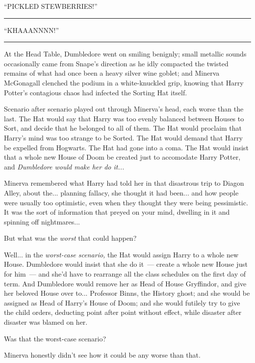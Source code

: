 ``PICKLED STEWBERRIES!''

\begin{center}\rule{3in}{0.4pt}\end{center}

``KHAAANNNN!''

\begin{center}\rule{3in}{0.4pt}\end{center}

At the Head Table, Dumbledore went on smiling benignly; small metallic sounds occasionally came from Snape's direction as he idly compacted the twisted remains of what had once been a heavy silver wine goblet; and Minerva McGonagall clenched the podium in a white-knuckled grip, knowing that Harry Potter's contagious chaos had infected the Sorting Hat itself.

Scenario after scenario played out through Minerva's head, each worse than the last. The Hat would say that Harry was too evenly balanced between Houses to Sort, and decide that he belonged to all of them. The Hat would proclaim that Harry's mind was too strange to be Sorted. The Hat would demand that Harry be expelled from Hogwarts. The Hat had gone into a coma. The Hat would insist that a whole new House of Doom be created just to accomodate Harry Potter, and \emph{Dumbledore would make her do it...}

Minerva remembered what Harry had told her in that disastrous trip to Diagon Alley, about the... planning fallacy, she thought it had been... and how people were usually too optimistic, even when they thought they were being pessimistic. It was the sort of information that preyed on your mind, dwelling in it and spinning off nightmares...

But what was the \emph{worst} that could happen?

Well... in the \emph{worst-case scenario,} the Hat would assign Harry to a whole new House. Dumbledore would insist that she do it~--- create a whole new House just for him~--- and she'd have to rearrange all the class schedules on the first day of term. And Dumbledore would remove her as Head of House Gryffindor, and give her beloved House over to... Professor Binns, the History ghost; and she would be assigned as Head of Harry's House of Doom; and she would futilely try to give the child orders, deducting point after point without effect, while disaster after disaster was blamed on her.

Was that the worst-case scenario?

Minerva honestly didn't see how it could be any worse than that.

